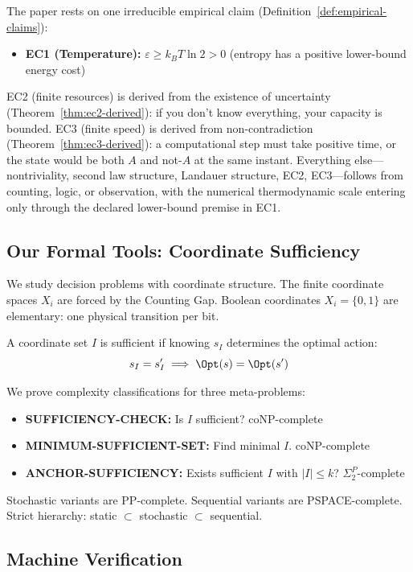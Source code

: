 \noindent The paper rests on one irreducible empirical claim (Definition~\ref{def:empirical-claims}):

\begin{itemize}
\item \textbf{EC1 (Temperature):} $\varepsilon \geq k_B T \ln 2 > 0$ (entropy has a positive lower-bound energy cost)
\end{itemize}

\noindent EC2 (finite resources) is derived from the existence of uncertainty (Theorem~\ref{thm:ec2-derived}): if you don't know everything, your capacity is bounded. EC3 (finite speed) is derived from non-contradiction (Theorem~\ref{thm:ec3-derived}): a computational step must take positive time, or the state would be both $A$ and not-$A$ at the same instant. Everything else---nontriviality, second law structure, Landauer structure, EC2, EC3---follows from counting, logic, or observation, with the numerical thermodynamic scale entering only through the declared lower-bound premise in EC1.

\subsection{Our Formal Tools: Coordinate Sufficiency}\label{sec:intro-formal-tools}

We study decision problems with coordinate structure. The finite coordinate spaces $X_i$ are forced by the Counting Gap. Boolean coordinates $X_i = \{0,1\}$ are elementary: one physical transition per bit.

A coordinate set $I$ is sufficient if knowing $s_I$ determines the optimal action:
\[
s_I = s'_I \implies \Opt(s) = \Opt(s')
\]

We prove complexity classifications for three meta-problems:

\begin{itemize}
\item \textbf{SUFFICIENCY-CHECK:} Is $I$ sufficient? coNP-complete
\item \textbf{MINIMUM-SUFFICIENT-SET:} Find minimal $I$. coNP-complete
\item \textbf{ANCHOR-SUFFICIENCY:} Exists sufficient $I$ with $|I| \leq k$? $\Sigma_2^P$-complete
\end{itemize}

Stochastic variants are PP-complete. Sequential variants are PSPACE-complete. Strict hierarchy: static $\subset$ stochastic $\subset$ sequential.

\subsection{Machine Verification}\label{sec:intro-verification}

